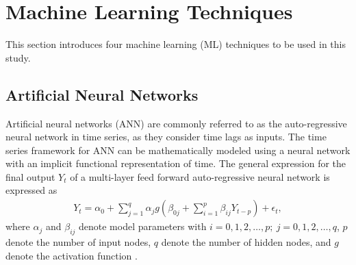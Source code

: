 \documentclass[twoside]{article}
\begin{document}
\section{Machine Learning Techniques}%
This section introduces  four machine learning (ML) techniques to be used in this study. 
\subsection{Artificial Neural Networks} 
Artificial neural networks (ANN) are commonly referred to as the auto-regressive neural network in time series, as they consider time lags as inputs. The time series framework for ANN can be mathematically modeled using a neural network with an implicit functional representation of time. The general expression for the final output $Y_{t}$ of a multi-layer feed forward auto-regressive neural network is expressed as 
\begin{align*}
    Y_{t} = \alpha_{0} + \sum_{j=1}^{q} \alpha_{j}g \left( \beta_{0j} + \sum_{i=1}^{p} \beta_{ij} Y_{t-p} \right) + \epsilon_{t},
\end{align*}
where $\alpha_{j}$ and $\beta_{ij}$ denote model parameters with $i=0,1,2,\dots,p; \ j=0,1,2,\dots,q$, $p$ denote the number of input nodes, $q$ denote the number of hidden nodes, and $g$ denote the activation function \cite{Rathod : 2021}.%
\end{document}
